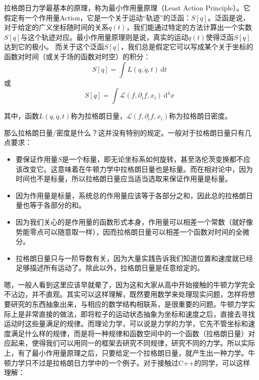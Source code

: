 \documentclass{ctexart}
\begin{document}
拉格朗日力学最基本的原理，称为最小作用量原理（Least Action Principle）。它假定有一个作用量Action，它是一个关于运动“轨迹”的泛函：$S[q]$。泛函是说，对于给定的广义坐标随时间的关系$q(t)$，我们能通过特定的方法计算出一个实数$S[q]$与这个轨迹对应。最小作用量原理则是说，真实的运动$q(t)$使得泛函$S[q]$达到它的极小。
而关于这个泛函$S[q]$，我们总是假定它可以写成某个关于坐标的函数对时间（或关于场的函数对时空）的积分：
\begin{equation}
S[q]=\int L(q,\dot{q},t)\,\mathrm{d}t
\end{equation}
或
\begin{equation}
S[q]=\int \mathcal{L}(f,\partial_if,x_i)\,\mathrm{d}^4x
\end{equation}

其中，函数$L(q,\dot{q},t)$称为拉格朗日量，$\mathcal{L}(f,\partial_if,x_i)$称为拉格朗日密度。

那么拉格朗日量/密度是什么？这并没有特别的规定。一般对于拉格朗日量只有几点要求：

\begin{itemize}
\item 要保证作用量$S$是一个标量，即无论坐标系如何旋转，甚至洛伦茨变换都不应该改变它。这意味着在牛顿力学中拉格朗日量也是标量。而在相对论中，因为时间也不是标量，所以拉格朗日量应当适当选取来保证作用量是标量。
\item 因为作用量是标量，系统总的作用量应该等于各部分之和，因此总的拉格朗日量也等于各部分的和。
\item 因为我们关心的是作用量的函数形式本身，作用量可以相差一个常数（就好像势能零点可以随意取一样），因而拉格朗日量可以相差一个函数对时间的全微分。
\item 拉格朗日量只与一阶导数有关，因为大量实践告诉我们知道位置和速度就已经足够描述所有运动了。除此以外，拉格朗日量是任意给定的。
\end{itemize}

\vspace{2ex}

嗯，一般人看到这里应该早就晕了，因为这和大家从高中开始接触的牛顿力学完全不沾边，并不直观。其实可以这样理解，既然要用数学来处理现实问题，怎样将想要研究的东西抽象出来，与相应的数学结构相联系，是很重要的问题。牛顿力学实际上是非常直接的做法，即将粒子的运动状态抽象为坐标和速度之后，直接去寻找运动时这些量满足的规律。而理论力学，可以说是力学的力学，它先不管坐标和速度满足什么样的规律，而是将一种规律和函数空间中的一个函数（拉格朗日量）对应起来，使得我们可以用同一的框架去研究不同规律，研究不同的力学。所以实际上，有了最小作用量原理之后，只要给定一个拉格朗日量，就产生出一种力学。牛顿力学只不过是拉格朗日力学中的一个例子。对于接触过C++的同学，可以这样理解：
\end{document}
